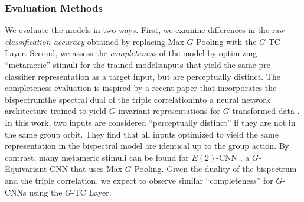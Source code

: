 



\subsubsection*{Evaluation Methods}

We evaluate the models in two ways. First, we examine differences in the raw \textit{classification accuracy} obtained by replacing Max $G$-Pooling with the $G$-TC Layer. Second, we assess the \textit{completeness} of the model by optimizing ``metameric'' stimuli for the trained models\textemdash inputs that yield the same pre-classifier representation as a target input, but are perceptually distinct. The completeness evaluation is inspired by a recent paper that incorporates the bispectrum\textemdash the spectral dual of the triple correlation\textemdash into a neural network architecture trained to yield $G$-invariant representations for $G$-transformed data \cite{sanborn2023bispectral}. In this work, two inputs are considered ``perceptually distinct'' if they are not in the same group orbit. They find that all inputs optimized to yield the same representation in the bispectral model are identical up to the group action. By contrast, many metameric stimuli can be found for $E(2)$-CNN \cite{e2cnn}, a $G$-Equivariant CNN that uses Max $G$-Pooling. Given the duality of the bispectrum and the triple correlation, we expect to observe similar ``completeness'' for $G$-CNNs using the $G$-TC Layer.








